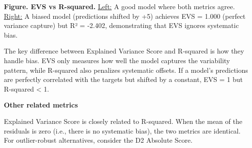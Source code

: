 \textbf{Figure. EVS vs R-squared.} \underline{Left:} A good model where both metrics agree.
\underline{Right:} A biased model (predictions shifted by +5) achieves EVS = 1.000 (perfect variance capture) but R² = -2.402, demonstrating that EVS ignores systematic bias.

{The key difference between Explained Variance Score and R-squared is how they handle bias. EVS only measures how well the model captures
the variability pattern, while R-squared also penalizes systematic offsets. If a model's predictions are perfectly correlated with the targets but shifted by a constant,
EVS = 1 but R-squared < 1.}

\textbf{Other related metrics}

Explained Variance Score is closely related to R-squared. When the mean of the residuals is zero (i.e., there is no systematic bias), the two metrics are identical.
For outlier-robust alternatives, consider the D2 Absolute Score.
